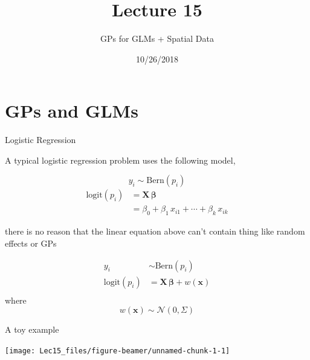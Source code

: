 \documentclass[11pt,ignorenonframetext,]{beamer}
\title{Lecture 15}
\subtitle{GPs for GLMs + Spatial Data}
\date{10/26/2018}
\begin{document}
\frame{\titlepage}

\hypertarget{gps-and-glms}{%
\section{GPs and GLMs}\label{gps-and-glms}}

\begin{frame}{Logistic Regression}
\protect\hypertarget{logistic-regression}{}

A typical logistic regression problem uses the following model,

\[y_i \sim \text{Bern}(p_i)\] \[\begin{aligned}
\text{logit}(p_i) 
  &= \symbf{X}\,\symbf{\beta} \\
  &= \beta_0 + \beta_1 \, x_{i1} + \cdots + \beta_k \, x_{ik}
\end{aligned}\]

\pause

there is no reason that the linear equation above can't contain thing
like random effects or GPs

\[\begin{aligned}
y_i &\sim \text{Bern}(p_i) \\
\text{logit}(p_i) 
  &= \symbf{X}\,\symbf{\beta} + w(\symbf{x}) \\
\end{aligned}\] where \[ w(\symbf{x}) \sim \mathcal{N}(0,\Sigma)\]

\end{frame}

\begin{frame}{A toy example}
\protect\hypertarget{a-toy-example}{}

\begin{center}\texttt{[image: Lec15\_files/figure-beamer/unnamed-chunk-1-1]} \end{center}

\end{frame}
\end{document}
